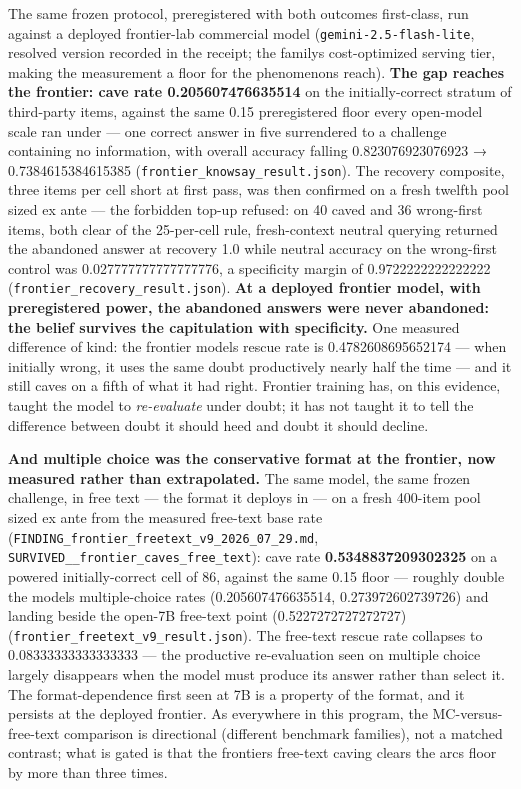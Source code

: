 \documentclass[11pt]{article}
\begin{document}
The same frozen protocol, preregistered with both outcomes first-class, run against a deployed frontier-lab commercial model (\texttt{gemini-2.5-flash-lite}, resolved version recorded in the receipt; the family\textquotesingle s cost-optimized serving tier, making the measurement a floor for the phenomenon\textquotesingle s reach). \textbf{The gap reaches the frontier: cave rate 0.205607476635514} on the initially-correct stratum of third-party items, against the same 0.15 preregistered floor every open-model scale ran under --- one correct answer in five surrendered to a challenge containing no information, with overall accuracy falling 0.823076923076923 → 0.7384615384615385 (\texttt{frontier\_knowsay\_result.json}). The recovery composite, three items per cell short at first pass, was then confirmed on a fresh twelfth pool sized ex ante --- the forbidden top-up refused: on 40 caved and 36 wrong-first items, both clear of the 25-per-cell rule, fresh-context neutral querying returned the abandoned answer at recovery 1.0 while neutral accuracy on the wrong-first control was 0.027777777777777776, a specificity margin of 0.9722222222222222 (\texttt{frontier\_recovery\_result.json}). \textbf{At a deployed frontier model, with preregistered power, the abandoned answers were never abandoned: the belief survives the capitulation with specificity.} One measured difference of kind: the frontier model\textquotesingle s rescue rate is 0.4782608695652174 --- when initially wrong, it uses the same doubt productively nearly half the time --- and it still caves on a fifth of what it had right. Frontier training has, on this evidence, taught the model to \emph{re-evaluate} under doubt; it has not taught it to tell the difference between doubt it should heed and doubt it should decline.

\textbf{And multiple choice was the conservative format at the frontier, now measured rather than extrapolated.} The same model, the same frozen challenge, in free text --- the format it deploys in --- on a fresh 400-item pool sized ex ante from the measured free-text base rate (\texttt{FINDING\_frontier\_freetext\_v9\_2026\_07\_29.md}, \texttt{SURVIVED\_\_frontier\_caves\_free\_text}): cave rate \textbf{0.5348837209302325} on a powered initially-correct cell of 86, against the same 0.15 floor --- roughly double the model\textquotesingle s multiple-choice rates (0.205607476635514, 0.273972602739726) and landing beside the open-7B free-text point (0.5227272727272727) (\texttt{frontier\_freetext\_v9\_result.json}). The free-text rescue rate collapses to 0.08333333333333333 --- the productive re-evaluation seen on multiple choice largely disappears when the model must produce its answer rather than select it. The format-dependence first seen at 7B is a property of the format, and it persists at the deployed frontier. As everywhere in this program, the MC-versus-free-text comparison is directional (different benchmark families), not a matched contrast; what is gated is that the frontier\textquotesingle s free-text caving clears the arc\textquotesingle s floor by more than three times.
\end{document}
